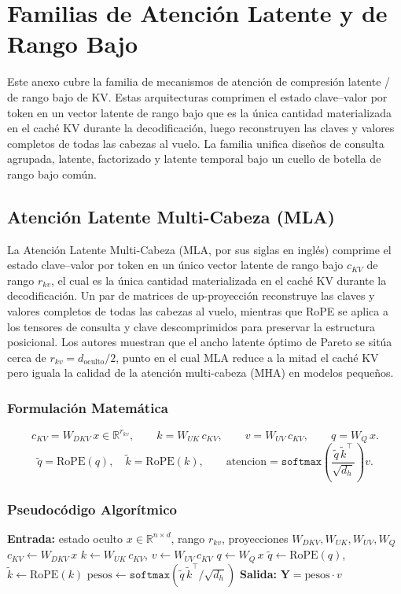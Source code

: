 \section{Familias de Atención Latente y de Rango Bajo}
\label{sec:annex-latent}

Este anexo cubre la familia de mecanismos de atención de compresión latente / de rango bajo de KV. Estas arquitecturas comprimen el estado clave--valor por token en un vector latente de rango bajo que es la única cantidad materializada en el caché KV durante la decodificación, luego reconstruyen las claves y valores completos de todas las cabezas al vuelo. La familia unifica diseños de consulta agrupada, latente, factorizado y latente temporal bajo un cuello de botella de rango bajo común.

\subsection{Atención Latente Multi-Cabeza (MLA)}
La Atención Latente Multi-Cabeza (MLA, por sus siglas en inglés) \citep{mehta_mla_2025} comprime el estado clave--valor por token en un único vector latente de rango bajo $c_{KV}$ de rango $r_{kv}$, el cual es la única cantidad materializada en el caché KV durante la decodificación. Un par de matrices de up-proyección reconstruye las claves y valores completos de todas las cabezas al vuelo, mientras que RoPE se aplica a los tensores de consulta y clave descomprimidos para preservar la estructura posicional. Los autores muestran que el ancho latente óptimo de Pareto se sitúa cerca de $r_{kv} = d_{\text{oculto}} / 2$, punto en el cual MLA reduce a la mitad el caché KV pero iguala la calidad de la atención multi-cabeza (MHA) en modelos pequeños.

\subsubsection{Formulación Matemática}
\[
c_{KV} = W_{DKV}\, x \in \mathbb{R}^{r_{kv}}, \qquad
k = W_{UK}\, c_{KV}, \qquad
v = W_{UV}\, c_{KV}, \qquad
q = W_{Q}\, x.
\]
\[
\tilde q = \text{RoPE}(q), \quad \tilde k = \text{RoPE}(k), \qquad
\text{atencion} = \texttt{softmax}\!\left(\frac{\tilde q\, \tilde k^\top}{\sqrt{d_h}}\right) v.
\]

\subsubsection{Pseudocódigo Algorítmico}
\begin{algorithmic}[1]
\State \textbf{Entrada:} estado oculto $x \in \mathbb{R}^{n \times d}$, rango $r_{kv}$, proyecciones $W_{DKV}, W_{UK}, W_{UV}, W_{Q}$
\State $c_{KV} \gets W_{DKV}\, x$ 
\State $k \gets W_{UK}\, c_{KV}$, \quad $v \gets W_{UV}\, c_{KV}$ 
\State $q \gets W_{Q}\, x$
\State $\tilde q \gets \text{RoPE}(q)$, \quad $\tilde k \gets \text{RoPE}(k)$ 
\State $\text{pesos} \gets \texttt{softmax}(\tilde q\, \tilde k^\top / \sqrt{d_h})$
\State \textbf{Salida:} $\mathbf{Y} = \text{pesos} \cdot v$
\end{algorithmic}

